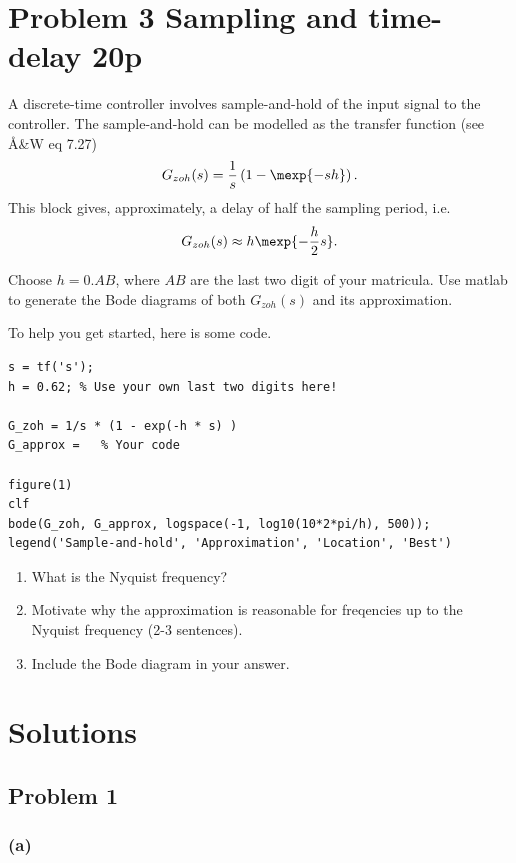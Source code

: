 \documentclass{scrartcl}
\begin{document}
\section*{Problem 3 Sampling and time-delay 20p}
\label{sec:orgheadline8}
A discrete-time controller involves sample-and-hold of the input signal to the controller. The sample-and-hold can be modelled as the transfer function (see Å\&W eq 7.27) 
\begin{equation}
G_{zoh}(s) = \frac{1}{s} \left( 1 - \mexp{-sh} \right).
\end{equation}
This block gives, approximately, a delay of half the sampling period, i.e. 
\begin{equation}
G_{zoh} (s) \approx h \mexp{-\frac{h}{2}s}.
\end{equation}

Choose  \(h=0.AB\), where \(AB\) are the last two digit of your matricula. Use matlab to generate the Bode diagrams of both \(G_{zoh}(s)\) and its approximation.

To help you get started, here is some code.
\begin{verbatim}
s = tf('s');
h = 0.62; % Use your own last two digits here!

G_zoh = 1/s * (1 - exp(-h * s) )
G_approx =   % Your code

figure(1)
clf
bode(G_zoh, G_approx, logspace(-1, log10(10*2*pi/h), 500));
legend('Sample-and-hold', 'Approximation', 'Location', 'Best')
\end{verbatim}

\begin{enumerate}
\item What is the Nyquist frequency?
\item Motivate why the approximation is reasonable for freqencies up to the Nyquist frequency (2-3 sentences).
\item Include the Bode diagram in your answer.
\end{enumerate}

\section*{Solutions}
\label{sec:orgheadline16}
\subsection*{Problem 1}
\label{sec:orgheadline11}
\subsubsection*{(a)}
\label{sec:orgheadline9}
\end{document}
